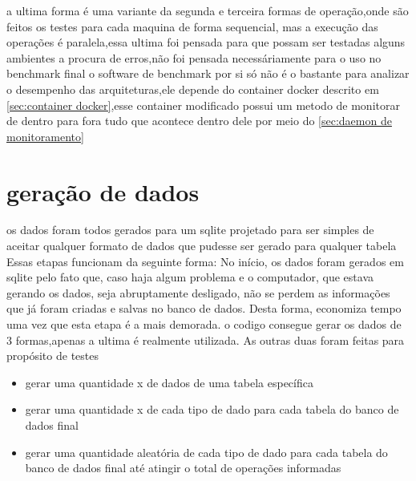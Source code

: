 \documentclass[
	12pt,				%
	openright,			%
	oneside,			%
	a4paper,			%
	english,			%
	french,				%
	spanish,			%
	brazil,				%
	]{abntex2}
\begin{document}
a ultima forma é uma variante da segunda e terceira formas de operação,onde são feitos os testes para cada maquina de forma sequencial, mas a execução das operações é paralela,essa ultima foi pensada para que possam ser testadas alguns ambientes a procura de erros,não foi pensada necessáriamente para o uso no benchmark final\newline
o software de benchmark por si só não é o bastante para analizar o desempenho das arquiteturas,ele depende do container docker descrito em \autoref{sec:container docker},esse container modificado possui um metodo de monitorar de dentro para fora tudo que acontece dentro dele por meio do \autoref{sec:daemon de monitoramento} \newline


\section{geração de dados}
\label{sec:geração de dados}
os dados foram todos gerados para um sqlite projetado para ser simples de aceitar qualquer formato de dados que pudesse ser gerado para qualquer tabela
Essas etapas funcionam da seguinte forma:\newline
No início, os dados foram gerados em sqlite pelo fato que, caso haja algum problema e o computador, que estava gerando os dados, seja abruptamente desligado, não se perdem as informações que já foram criadas e salvas no banco de dados. Desta forma, economiza tempo uma vez que esta etapa é a mais demorada.\newline
o codigo consegue gerar os dados de 3 formas,apenas a ultima é realmente utilizada.
As outras duas foram feitas para propósito de testes

\begin{itemize}
\item gerar uma quantidade x de dados de uma tabela específica
\item gerar uma quantidade x de cada tipo de dado para cada tabela do banco de dados final
\item gerar uma quantidade aleatória de cada tipo de dado para cada tabela do banco de dados final até atingir o total de operações informadas
\end{itemize}
\end{document}
